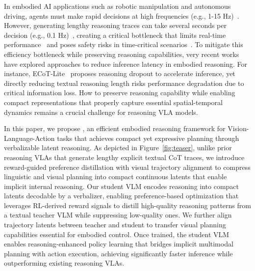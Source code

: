 In embodied AI applications such as robotic manipulation and autonomous driving, agents must make rapid decisions at high frequencies (e.g., 1-15 Hz)~\cite{guan2025efficient}. However, generating lengthy reasoning traces can take several seconds per decision (e.g., 0.1 Hz)~\cite{huang2025thinkact, lee2025molmoact}, creating a critical bottleneck that limits real-time performance~\cite{guan2025efficient, yu2025survey} and poses safety risks in time-critical scenarios~\cite{wang2025alpamayo}. To mitigate this efficiency bottleneck while preserving reasoning capabilities, very recent works~\cite{chen2025training, yu2025survey, guan2025efficient} have explored approaches to reduce inference latency in embodied reasoning. For instance, ECoT-Lite~\cite{chen2025training} proposes reasoning dropout to accelerate inference, yet directly reducing textual reasoning length risks performance degradation due to critical information loss. How to preserve reasoning capability while enabling compact representations that properly capture essential spatial-temporal dynamics remains a crucial challenge for reasoning VLA models.



In this paper, we propose \textit{\ours{}}, an efficient embodied reasoning framework for Vision-Language-Action tasks that achieves compact yet expressive planning through verbalizable latent reasoning. As depicted in Figure~\ref{fig:teaser}, unlike prior reasoning VLAs that generate lengthy explicit textual CoT traces, we introduce reward-guided preference distillation with visual trajectory alignment to compress linguistic and visual planning into compact continuous latents that enable implicit internal reasoning. Our student VLM encodes reasoning into compact latents decodable by a verbalizer, enabling preference-based optimization that leverages RL-derived reward signals to distill high-quality reasoning patterns from a textual teacher VLM while suppressing low-quality ones. We further align trajectory latents between teacher and student to transfer visual planning capabilities essential for embodied control. Once trained, the student VLM enables reasoning-enhanced policy learning that bridges implicit multimodal planning with action execution, achieving significantly faster inference while outperforming existing reasoning VLAs.



